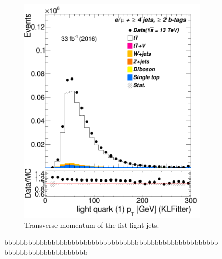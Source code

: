 \begin{figure}
\begin{subfigure}{0.35\textwidth}
		\includegraphics[width=\linewidth]{ControlPlots_emujets_2016_4incl_2incl/klf_lq1_pt_emujets_2016.png}
		\caption{Transverse momentum of the fist light jets. } \label{fig:klf11}
	\end{subfigure}
	\caption{bbbbbbbbbbbbbbbbbbbbbbbbbbbbbbbbbbbbbbbbbbbbbbbbbbbbbbbbbbbbbbbbbbbbbbbbbbb}
\end{figure}	







